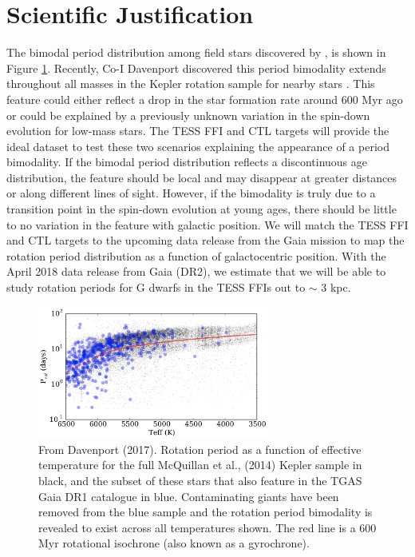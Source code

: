 \documentclass[useAMS, usenatbib, preprint, 12pt]{aastex}
\begin{document}
\section{Scientific Justification}

The bimodal period distribution among field stars discovered by
\citet{mcquillan2013}, is shown in Figure \ref{fig:davenport}.
Recently, Co-I Davenport discovered this period bimodality extends throughout
all masses in the Kepler rotation sample for nearby stars
\citep{davenport2017}.
This feature could either reflect a drop in the star formation rate around 600
Myr ago or could be explained by a previously unknown variation in the
spin-down evolution for low-mass stars.
The TESS FFI and CTL targets will provide the ideal dataset to test these two
scenarios explaining the appearance of a period bimodality.
If the bimodal period distribution reflects a discontinuous age distribution,
the feature should be local and may disappear at greater distances or along
different lines of sight.
However, if the bimodality is truly due to a transition point in the spin-down
evolution at young ages, there should be little to no variation in the feature
with galactic position.
We will match the TESS FFI and CTL targets to the upcoming data
release from the Gaia mission \citep{perryman2001} to map the rotation period
distribution as a function of galactocentric position.
With the April 2018 data release from Gaia (DR2), we estimate that we will be
able to study rotation periods for G dwarfs in the TESS FFIs out to $\sim$ 3
kpc.


\begin{figure}
\begin{center}
\includegraphics[width=3in, clip=true]{Davenport.png}
\caption{From Davenport (2017).
    Rotation period as a function of effective
temperature for the full McQuillan et al., (2014) Kepler sample in black, and
the subset of these stars that also feature in the TGAS Gaia DR1 catalogue in
blue. Contaminating giants have been removed from the blue sample and the
rotation period bimodality is revealed to exist across all temperatures shown.
    The red line is a 600 Myr rotational isochrone (also known as a gyrochrone).}
\label{fig:davenport}
\end{center}
\end{figure}
\end{document}
